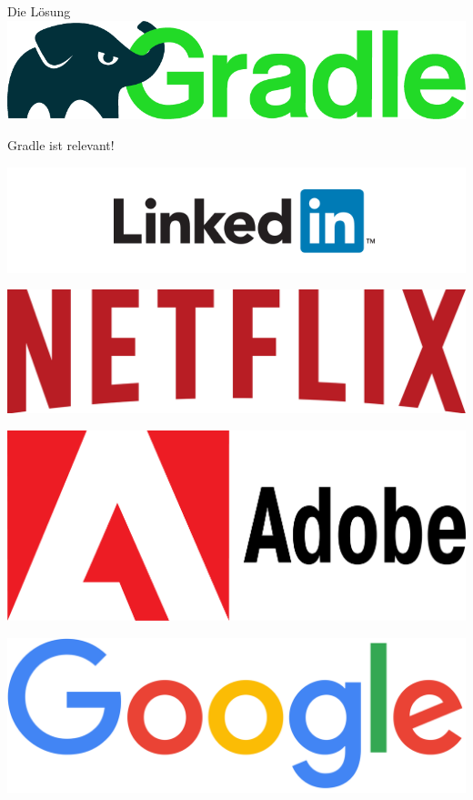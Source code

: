 \documentclass{beamer}
\begin{document}
\begin{frame}{Die Lösung}
	\includegraphics[width=\linewidth]{logo_gradle.png}
\end{frame}

\begin{frame}{Gradle ist relevant!}
	\begin{minipage}{0.49\linewidth}
		\includegraphics[width=\linewidth]{logo-linkedin.png}
	\end{minipage}
	\begin{minipage}{0.49\linewidth}
		\includegraphics[width=\linewidth]{logo-netflix.png}
	\end{minipage}

	\begin{minipage}{0.49\linewidth}
		\includegraphics[width=\linewidth]{logo-adobe.png}
	\end{minipage}
	\begin{minipage}{0.49\linewidth}
		\includegraphics[width=\linewidth]{logo-google.png}
	\end{minipage}


\end{frame}
\end{document}

